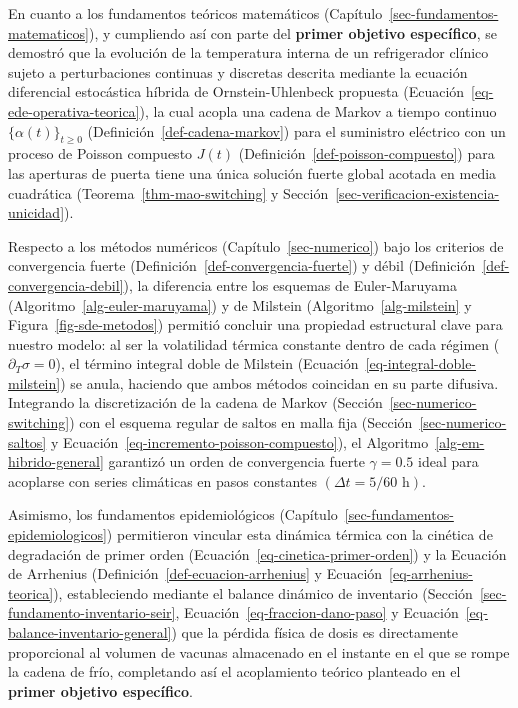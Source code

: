\documentclass[
  spanish,
  us-letterpaper,
]{scrreprt}
\numberwithin{equation}{section}
\theoremstyle{plain}
\theoremstyle{plain}
\theoremstyle{definition}
\theoremstyle{plain}
\theoremstyle{remark}
\begin{document}
En cuanto a los fundamentos teóricos matemáticos
(Capítulo~\ref{sec-fundamentos-matematicos}), y cumpliendo así con parte
del \textbf{primer objetivo específico}, se demostró que la evolución de
la temperatura interna de un refrigerador clínico sujeto a
perturbaciones continuas y discretas descrita mediante la ecuación
diferencial estocástica híbrida de Ornstein-Uhlenbeck propuesta
(Ecuación~\ref{eq-ede-operativa-teorica}), la cual acopla una cadena de
Markov a tiempo continuo \(\{\alpha(t)\}_{t \ge 0}\)
(Definición~\ref{def-cadena-markov}) para el suministro eléctrico con un
proceso de Poisson compuesto \(J(t)\)
(Definición~\ref{def-poisson-compuesto}) para las aperturas de puerta
tiene una única solución fuerte global acotada en media cuadrática
(Teorema~\ref{thm-mao-switching} y
Sección~\ref{sec-verificacion-existencia-unicidad}).

Respecto a los métodos numéricos (Capítulo~\ref{sec-numerico}) bajo los
criterios de convergencia fuerte
(Definición~\ref{def-convergencia-fuerte}) y débil
(Definición~\ref{def-convergencia-debil}), la diferencia entre los
esquemas de Euler-Maruyama (Algoritmo~\ref{alg-euler-maruyama}) y de
Milstein (Algoritmo~\ref{alg-milstein} y Figura~\ref{fig-sde-metodos})
permitió concluir una propiedad estructural clave para nuestro modelo:
al ser la volatilidad térmica constante dentro de cada régimen
(\(\partial_T \sigma = 0\)), el término integral doble de Milstein
(Ecuación~\ref{eq-integral-doble-milstein}) se anula, haciendo que ambos
métodos coincidan en su parte difusiva. Integrando la discretización de
la cadena de Markov (Sección~\ref{sec-numerico-switching}) con el
esquema regular de saltos en malla fija
(Sección~\ref{sec-numerico-saltos} y
Ecuación~\ref{eq-incremento-poisson-compuesto}), el
Algoritmo~\ref{alg-em-hibrido-general} garantizó un orden de
convergencia fuerte \(\gamma = 0.5\) ideal para acoplarse con series
climáticas en pasos constantes
\(\left( \Delta t = 5/60\text{ h} \right)\).

Asimismo, los fundamentos epidemiológicos
(Capítulo~\ref{sec-fundamentos-epidemiologicos}) permitieron vincular
esta dinámica térmica con la cinética de degradación de primer orden
(Ecuación~\ref{eq-cinetica-primer-orden}) y la Ecuación de Arrhenius
(Definición~\ref{def-ecuacion-arrhenius} y
Ecuación~\ref{eq-arrhenius-teorica}), estableciendo mediante el balance
dinámico de inventario (Sección~\ref{sec-fundamento-inventario-seir},
Ecuación~\ref{eq-fraccion-dano-paso} y
Ecuación~\ref{eq-balance-inventario-general}) que la pérdida física de
dosis es directamente proporcional al volumen de vacunas almacenado en
el instante en el que se rompe la cadena de frío, completando así el
acoplamiento teórico planteado en el \textbf{primer objetivo
específico}.
\end{document}
